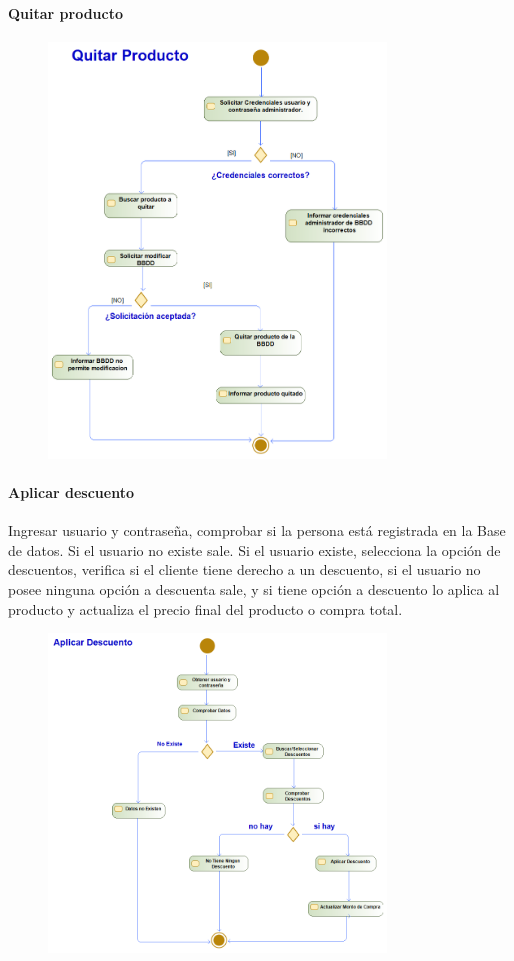 \paragraph{Quitar producto}
\begin{figure}[H]
    \centering
    \includegraphics[width=0.8\textwidth]{Use_Cases/ProyectoIS_QuitarProducto.png}
\end{figure}
\paragraph{Aplicar descuento}
Ingresar usuario y contraseña, comprobar si la persona está registrada en la Base de datos. Si el usuario no existe sale. Si el usuario existe, selecciona la opción de descuentos, verifica si el cliente tiene derecho a un descuento, si el usuario no posee ninguna opción a descuenta sale, y si tiene opción a descuento lo aplica al producto y actualiza el precio final del producto o compra total.
\begin{figure}[H]
    \centering
    \includegraphics[width=0.8\textwidth]{Use_Cases/aplicar_descuento.png}
\end{figure}
